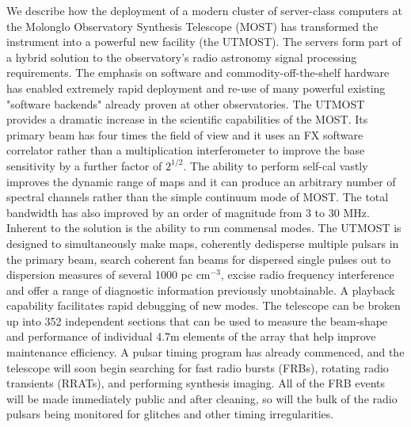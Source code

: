 We describe how the deployment of a modern cluster of server-class computers at the Molonglo Observatory Synthesis Telescope (MOST) has transformed the instrument into a powerful new facility (the UTMOST). The servers form part of a hybrid solution to the observatory's radio astronomy signal processing requirements. The emphasis on software and commodity-off-the-shelf hardware has enabled extremely rapid deployment and re-use of many powerful existing "software backends" already proven at other observatories. The UTMOST provides a dramatic increase in the scientific capabilities of the MOST. Its primary beam has four times the field of view and it uses an FX software correlator rather than a multiplication interferometer to improve the base sensitivity by a further factor of $2^{1/2}$. The ability to perform self-cal vastly improves the dynamic range of maps and it can produce an arbitrary number of spectral channels rather than the simple continuum mode of MOST. The total bandwidth has also improved by an order of magnitude from 3 to 30 MHz. Inherent to the solution is the ability to run commensal modes. The UTMOST is designed to simultaneously make maps, coherently dedisperse multiple pulsars in the primary beam, search coherent fan beams for dispersed single pulses out to dispersion measures of several 1000 pc cm$^{-3}$, excise radio frequency interference and offer a range of diagnostic information previously unobtainable. A playback capability facilitates rapid debugging of new modes. The telescope can be broken up into 352 independent sections that can be used to measure the beam-shape and performance of individual 4.7m elements of the array that help improve maintenance efficiency. A pulsar timing program has already commenced, and the telescope will soon begin searching for fast radio bursts (FRBs), rotating radio transients (RRATs), and performing synthesis imaging. All of the FRB events will be made immediately public and after cleaning, so will the bulk of the radio pulsars being monitored for glitches and other timing irregularities.
